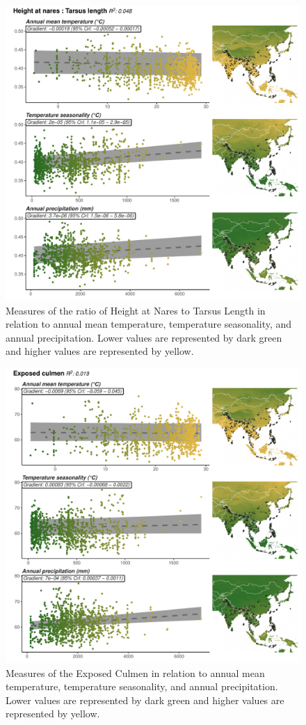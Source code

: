 \documentclass[10pt,a4paper]{article}
\begin{document}
\begin{figure}
\includegraphics[width=0.9\linewidth]{../Figures/climMap_HaNa.TaLe} \caption{Measures of the ratio of Height at Nares to Tarsus Length in relation to annual mean temperature, temperature seasonality, and annual precipitation. Lower values are represented by dark green and higher values are represented by yellow.}\label{fig:climateComparisonMapHaNaTaLe}
\end{figure}

\begin{figure}
\includegraphics[width=0.9\linewidth]{../Figures/climMap_Exposed.culmen} \caption{Measures of the Exposed Culmen in relation to annual mean temperature, temperature seasonality, and annual precipitation. Lower values are represented by dark green and higher values are represented by yellow.}\label{fig:climateComparisonMapExCu}
\end{figure}
\end{document}
